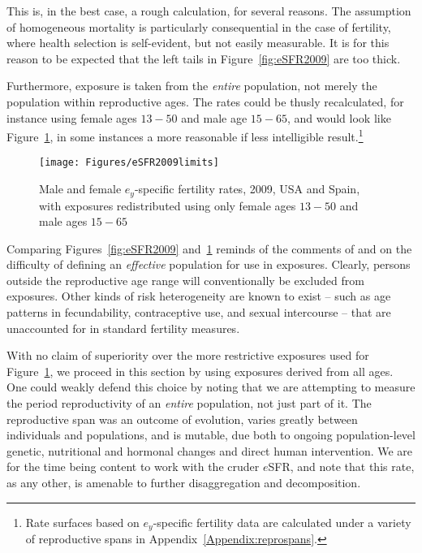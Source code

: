 This is, in the best case, a rough calculation, for several reasons. The
assumption of homogeneous mortality is particularly consequential in the case of 
fertility, where health selection is self-evident, but not easily measurable.
It is for this reason to be expected that the left tails in
Figure~\ref{fig:eSFR2009} are too thick. 

Furthermore, exposure is taken from the \textit{entire} population, not merely
the population within reproductive ages. The rates could be thusly recalculated,
for instance using female ages $13-50$ and male age $15-65$, and would look like 
Figure~\ref{fig:eSFR2009limits}, in some instances a more reasonable if less
intelligible result.\footnote{Rate surfaces based on $e_y$-specific fertility
data are calculated under a variety of reproductive spans in
Appendix~\ref{Appendix:reprospans}.}

\begin{figure}[ht!]
        \centering  
          \caption{Male and female $e_y$-specific fertility rates, 2009, USA and
          Spain, with exposures redistributed using only female ages $13-50$ and
          male ages $15-65$}
          \texttt{[image: Figures/eSFR2009limits]}
          \label{fig:eSFR2009limits}
\end{figure}

Comparing Figures~\ref{fig:eSFR2009} and~\ref{fig:eSFR2009limits} reminds of the
comments of \citet{gupta1978alternative} and \citet{mitra1976effect} on the difficulty of
defining an \textit{effective} population for use in exposures. Clearly, persons
outside the reproductive age range will conventionally be excluded from
exposures. Other kinds of risk heterogeneity are known to exist -- such as age
patterns in fecundability, contraceptive use, and sexual intercourse -- that are
unaccounted for in standard fertility measures. 

With no claim of superiority over the more
restrictive exposures used for Figure~\ref{fig:eSFR2009limits}, we proceed
in this section by using exposures derived from all ages. One could weakly
defend this choice by noting that we are attempting to measure the period
reproductivity of an \textit{entire} population, not just part of it. The
reproductive span was an outcome of evolution, varies greatly between
individuals and populations, and is mutable, due both to ongoing
population-level genetic, nutritional and hormonal changes and direct human
intervention. We are for the time being content to work with the cruder
$e$SFR, and note that this rate, as any other, is amenable to further disaggregation and
decomposition.

